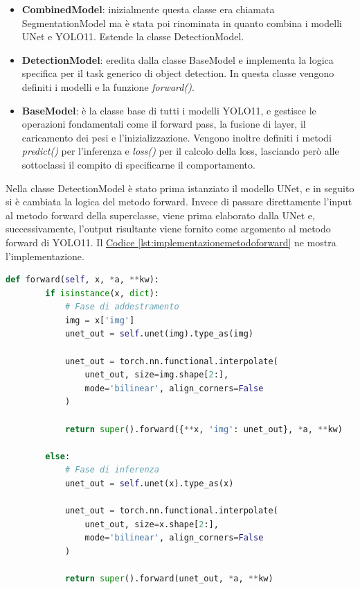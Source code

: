 \documentclass[12pt]{report}
\begin{document}
\begin{itemize}
	\item \textbf{CombinedModel}: inizialmente questa classe era chiamata SegmentationModel ma è stata poi rinominata in quanto combina i modelli UNet e YOLO11. Estende la classe DetectionModel.
	
	\item \textbf{DetectionModel}: eredita dalla classe BaseModel e implementa la logica specifica per il task generico di object detection. In questa classe vengono definiti i modelli e la funzione \textit{forward()}.
	
	\item \textbf{BaseModel}: è la classe base di tutti i modelli YOLO11, e gestisce le operazioni fondamentali come il forward pass, la fusione di layer, il caricamento dei pesi e l'inizializzazione. Vengono inoltre definiti i metodi \textit{predict()} per l'inferenza e \textit{loss()} per il calcolo della loss, lasciando però alle sottoclassi il compito di specificarne il comportamento.
\end{itemize}

Nella classe DetectionModel è stato prima istanziato il modello UNet, e in seguito si è cambiata la logica del metodo forward. Invece di passare direttamente l'input al metodo forward della superclasse, viene prima elaborato dalla UNet e, successivamente, l'output risultante viene fornito come argomento al metodo forward di YOLO11. Il \hyperref[lst:implementazionemetodoforward]{Codice \ref{lst:implementazionemetodoforward}} ne mostra l'implementazione.

\lstset{style=pythonstyle}
\begin{lstlisting}[language=Python, caption={Implementazione del metodo forward nella classe DetectionModel.}, label={lst:implementazionemetodoforward}, float]
	def forward(self, x, *a, **kw):
		if isinstance(x, dict):
			# Fase di addestramento
			img = x['img']
			unet_out = self.unet(img).type_as(img)
			
			unet_out = torch.nn.functional.interpolate(
				unet_out, size=img.shape[2:], 
				mode='bilinear', align_corners=False
			)
			
			return super().forward({**x, 'img': unet_out}, *a, **kw)
		
		else:
			# Fase di inferenza
			unet_out = self.unet(x).type_as(x)
			
			unet_out = torch.nn.functional.interpolate(
				unet_out, size=x.shape[2:], 
				mode='bilinear', align_corners=False
			)
			
			return super().forward(unet_out, *a, **kw)
\end{lstlisting}
\end{document}
